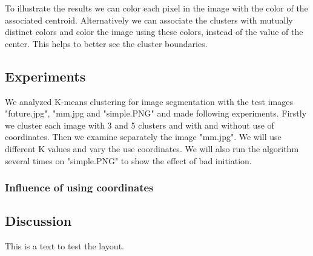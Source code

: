To illustrate the results we can color each pixel in the image with the color of the associated centroid. Alternatively we can associate the clusters with mutually distinct colors and color the image using these colors, instead of the value of the center. This helps to better see the cluster boundaries.

\subsection{Experiments}

We analyzed K-means clustering for image segmentation with the test images "future.jpg", "mm.jpg and "simple.PNG" and made following experiments. Firstly we cluster each image with 3 and 5 clusters and with and without use of coordinates. Then we examine separately the image "mm.jpg". We will use different K values and vary the use coordinates. We will also run the algorithm several times on "simple.PNG" to show the effect of bad initiation.

\subsubsection{Influence of using coordinates}




\subsection{Discussion}

This is a text to test the layout.